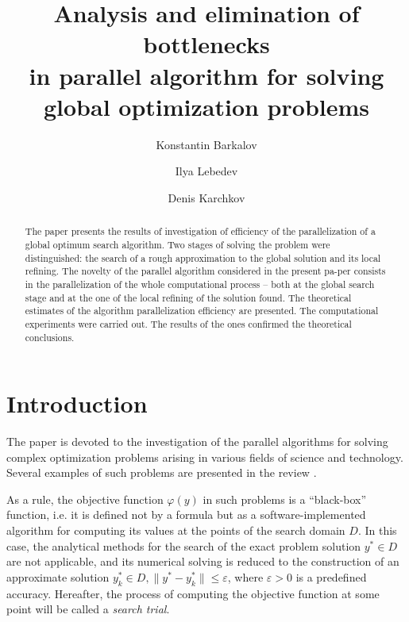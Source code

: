 \documentclass[runningheads]{llncs}
\begin{document}
%
\title{Analysis and elimination of bottlenecks\\ in parallel algorithm for solving\\ global optimization problems}
%
%
\author{
Konstantin Barkalov  \and
Ilya Lebedev  \and
Denis Karchkov 
}
%
%

%
\maketitle              %
%
\begin{abstract}
The paper presents the results of investigation of efficiency of the parallelization of a global optimum search algorithm. Two stages of solving the problem were distinguished: the search of a rough approximation to the global solution and its local refining. The novelty of the parallel algorithm considered in the present pa-per consists in the parallelization of the whole computational process -- both at the global search stage and at the one of the local refining of the solution found. The theoretical estimates of the algorithm parallelization efficiency are presented. The computational experiments were carried out. The results of the ones confirmed the theoretical conclusions.

\end{abstract}
%
%
%
\section{Introduction}

The paper is devoted to the investigation of the parallel algorithms for solving complex optimization problems arising in various fields of science and technology. Several examples of such problems are presented in the review \cite{Pinter2006}.

As a rule, the objective function $\varphi(y)$ in such problems is a ``black-box'' function, i.e. it is defined not by a formula but as a software-implemented algorithm for computing its values at the points of the search domain $D$. In this case, the analytical methods for the search of the exact problem solution $y^{*}  \in D$ are not applicable, and its numerical solving is reduced to the construction of an approximate solution $y_k^* \in D, \|y^{*} - y_k^*\| \leq \varepsilon$, where $\varepsilon > 0$ is a predefined accuracy. Hereafter, the process of computing the objective function at some point will be called a \textit{search trial}.
\end{document}
